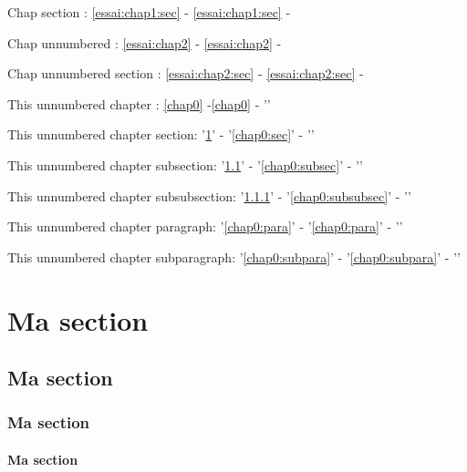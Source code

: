 \documentclass[bare]{polytech/polytech}
\begin{document}
Chap section : \ref{essai:chap1:sec} - \autoref{essai:chap1:sec} - 


Chap unnumbered : \ref{essai:chap2} - \autoref{essai:chap2} -        

Chap unnumbered section : \ref{essai:chap2:sec} - \autoref{essai:chap2:sec} - 

This unnumbered chapter : \ref{chap0} -\autoref{chap0} - ''  
  
This unnumbered chapter section: '\ref{chap0:sec}' - '\autoref{chap0:sec}' - ''  

This unnumbered chapter subsection: '\ref{chap0:subsec}' - '\autoref{chap0:subsec}' - ''

This unnumbered chapter subsubsection: '\ref{chap0:subsubsec}' - '\autoref{chap0:subsubsec}' - ''

This unnumbered chapter paragraph: '\ref{chap0:para}' - '\autoref{chap0:para}' - ''

This unnumbered chapter subparagraph: '\ref{chap0:subpara}' - '\autoref{chap0:subpara}' - ''
              

\lipsum[1-5]

\section{Ma section}

\label{chap0:sec}

\lipsum[1-3]

\subsection{Ma section}

\label{chap0:subsec}

\lipsum[1-3]

\subsubsection{Ma section}

\label{chap0:subsubsec}

\lipsum[1-3]

\paragraph{Ma section}
\end{document}
